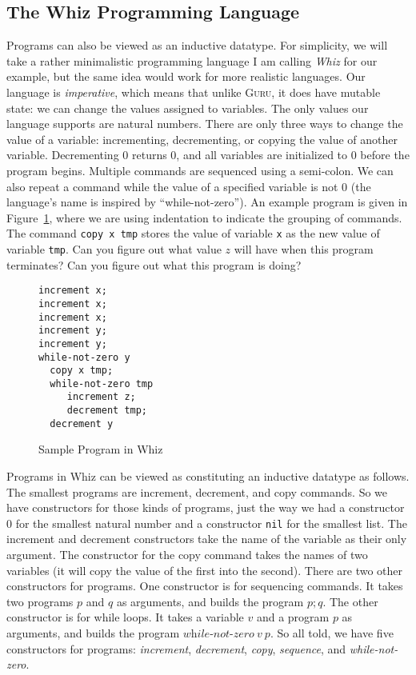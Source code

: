 \documentclass{book}[12pt]
\newcommand{\guru}[0]{\textsc{Guru}}
\begin{document}
\subsection{The Whiz Programming Language}
\label{sec:whiz}

Programs can also be viewed as an inductive datatype.  For simplicity,
we will take a rather minimalistic programming language I am calling
\emph{Whiz} for our example, but the same idea would work for more
realistic languages.  Our language is \emph{imperative}, which means
that unlike \guru, it does have mutable state: we can change the values
assigned to variables.  The only values our language supports are
natural numbers.  There are only three ways to change the value of a
variable: incrementing, decrementing, or copying the value of another
variable.  Decrementing 0 returns 0, and all variables are initialized
to 0 before the program begins.  Multiple commands are sequenced using
a semi-colon.  We can also repeat a command while the value of a
specified variable is not 0 (the language's name is inspired by
``while-not-zero'').  An example program is given in
Figure~\ref{fig:whizprog}, where we are using indentation to indicate
the grouping of commands.  The command \texttt{copy x tmp} stores the
value of variable \texttt{x} as the new value of variable
\texttt{tmp}.  Can you figure out what value $z$ will have when this
program terminates?  Can you figure out what this program is doing?

\begin{figure}
\begin{verbatim}
increment x;
increment x;
increment x;
increment y;
increment y;
while-not-zero y 
  copy x tmp;
  while-not-zero tmp
     increment z;
     decrement tmp;
  decrement y
\end{verbatim}
\caption{\label{fig:whizprog}Sample Program in Whiz}
\end{figure}

Programs in Whiz can be viewed as constituting an inductive datatype
as follows.  The smallest programs are increment, decrement, and copy
commands.  So we have constructors for those kinds of programs, just
the way we had a constructor $0$ for the smallest natural number and a
constructor \texttt{nil} for the smallest list.  The increment and
decrement constructors take the name of the variable as their only
argument.  The constructor for the copy command takes the names of two
variables (it will copy the value of the first into the second).
There are two other constructors for programs.  One constructor is for
sequencing commands.  It takes two programs $p$ and $q$ as arguments,
and builds the program $p; q$.  The other constructor is for while
loops.  It takes a variable $v$ and a program $p$ as arguments, and
builds the program $\textit{while-not-zero}\ v\ p$.  So all told, we
have five constructors for programs: \textit{increment},
\textit{decrement}, \textit{copy}, \textit{sequence}, and
\textit{while-not-zero}.
\end{document}
